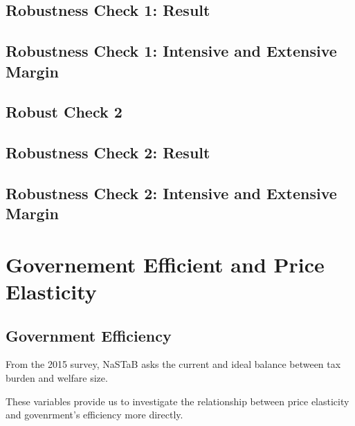\documentclass[ review  , 3p ]{elsarticle}
\begin{document}
  \hypertarget{robustness-check-1-result}{%
  \subsection{Robustness Check 1: Result}\label{robustness-check-1-result}}
  
  \hypertarget{robustness-check-1-intensive-and-extensive-margin}{%
  \subsection{Robustness Check 1: Intensive and Extensive Margin}\label{robustness-check-1-intensive-and-extensive-margin}}
  
  \hypertarget{robust-check-2}{%
  \subsection{Robust Check 2}\label{robust-check-2}}
  
  \hypertarget{robustness-check-2-result}{%
  \subsection{Robustness Check 2: Result}\label{robustness-check-2-result}}
  
  \hypertarget{robustness-check-2-intensive-and-extensive-margin}{%
  \subsection{Robustness Check 2: Intensive and Extensive Margin}\label{robustness-check-2-intensive-and-extensive-margin}}
  
  \hypertarget{governement-efficient-and-price-elasticity}{%
  \section{Governement Efficient and Price Elasticity}\label{governement-efficient-and-price-elasticity}}
  
  \hypertarget{government-efficiency}{%
  \subsection{Government Efficiency}\label{government-efficiency}}
  
  From the 2015 survey,
  NaSTaB asks the current and ideal balance between tax burden and welfare size.
  
  These variables provide us to investigate the relationship between price elasticity and govenrment's efficiency
  more directly.
  
\end{document}
